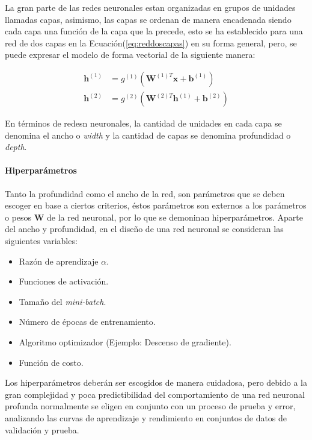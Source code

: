         La gran parte de las redes neuronales estan organizadas en grupos de unidades llamadas capas, asimismo, las capas se 
        ordenan de manera encadenada siendo cada capa una función de la capa que la precede, esto se ha establecido para una red de 
        dos capas en la Ecuación(\ref{eq:reddoscapas}) en su forma general, pero, se puede expresar el modelo de forma vectorial
        de la siguiente manera:

        \begin{align}
            \mathbf{h}^{(1)} &= g^{(1)} \left( \mathbf{W}^{(1)T}\mathbf{x} + \mathbf{b}^{(1)} \right) \\
            \mathbf{h}^{(2)} &= g^{(2)} \left( \mathbf{W}^{(2)T}\mathbf{h}^{(1)} + \mathbf{b}^{(2)} \right)
        \end{align}

        En términos de redesn neuronales, la cantidad de unidades en cada capa se denomina el ancho o \textit{width} 
        y la cantidad de capas se denomina profundidad o \textit{depth}.

            \paragraph{Hiperparámetros}
            Tanto la profundidad como el ancho de la red, son parámetros que se deben escoger en base a ciertos criterios, 
            éstos parámetros son externos a los parámetros o pesos $\mathbf{W}$ de la red neuronal, por lo que se demoninan
            hiperparámetros. Aparte del ancho y profundidad, en el diseño de una red neuronal se consideran las siguientes 
            variables:

            \begin{itemize}
                \item Razón de aprendizaje $\alpha$.
                \item Funciones de activación.
                \item Tamaño del \textit{mini-batch}.
                \item Número de épocas de entrenamiento.
                \item Algoritmo optimizador (Ejemplo: Descenso de gradiente).
                \item Función de costo.
            \end{itemize}

            Los hiperparámetros deberán ser escogidos de manera cuidadosa, pero debido a la gran complejidad y poca predictibilidad
            del comportamiento de una red neuronal profunda normalmente se eligen en conjunto con un proceso de prueba y error, 
            analizando las curvas de aprendizaje y rendimiento en conjuntos de datos de validación y prueba.

